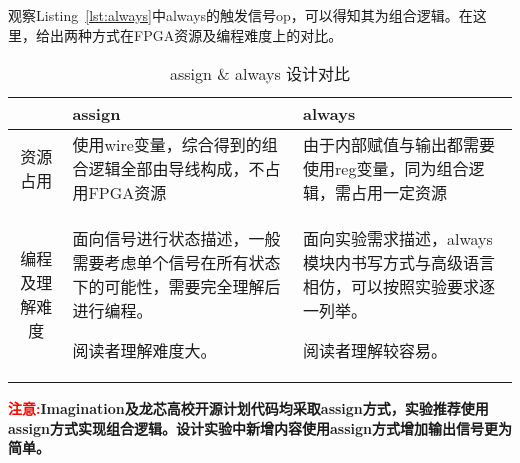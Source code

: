 观察Listing~\ref{lst:always}中always的触发信号op，可以得知其为组合逻辑。在这里，给出两种方式在FPGA资源及编程难度上的对比。


\begin{table}[htbp]
    \centering
    \begin{tabular}{c|p{5cm}|p{5cm}}
         \hline
          & assign & always \\
         \hline
         资源占用  &  使用wire变量，综合得到的组合逻辑全部由导线构成，不占用FPGA资源 & 由于内部赋值与输出都需要使用reg变量，同为组合逻辑，需占用一定资源 \\
         \hline
         编程及理解难度 & 面向信号进行状态描述，一般需要考虑单个信号在所有状态下的可能性，需要完全理解后进行编程。
        
        阅读者理解难度大。
        & 面向实验需求描述，always模块内书写方式与高级语言相仿，可以按照实验要求逐一列举。

        阅读者理解较容易。
        \\
         \hline
    \end{tabular}
    \caption{assign \& always 设计对比}
    \label{tab:design_compare}
\end{table}

\textcolor{red}{\textbf{注意:}}\textbf{Imagination及龙芯高校开源计划代码均采取assign方式，实验推荐使用assign方式实现组合逻辑。设计实验中新增内容使用assign方式增加输出信号更为简单。}